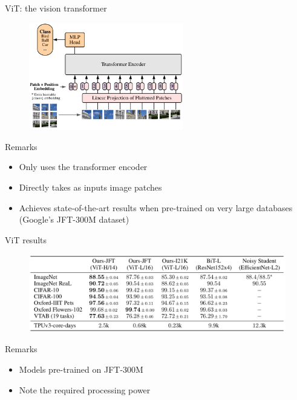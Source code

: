 \documentclass[xcolor=pdftex,dvipsnames,table,mathserif]{beamer}
\begin{document}
\begin{frame}{ViT: the vision transformer~\cite{dosovitskiy_image_2021}}

\begin{figure}[ht]
  \centering
  \includegraphics[width=0.6\textwidth]{vision_transformer}
\end{figure}

\begin{block}{Remarks}
  \begin{itemize}
  \item Only uses the transformer encoder
  \item Directly takes as inputs image patches
  \item Achieves state-of-the-art results when pre-trained on very large databases (Google's JFT-300M dataset)
  \end{itemize}
\end{block}


\end{frame}


\begin{frame}{ViT results}

\begin{figure}[ht]
  \centering
  \includegraphics[width=\textwidth]{vit_table}
\end{figure}

\begin{block}{Remarks}
  \begin{itemize}
  \item Models pre-trained on JFT-300M
  \item Note the required processing power
  \end{itemize}

\end{block}

\end{frame}
\end{document}
